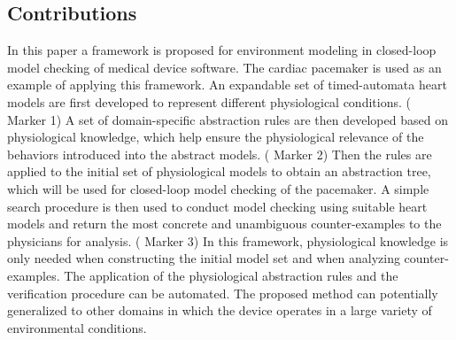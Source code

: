 \subsection{Contributions}
In this paper a framework is proposed for environment modeling in closed-loop model checking of medical device software.
The cardiac pacemaker is used as an example of applying this framework.
An expandable set of timed-automata heart models are first developed to represent different physiological conditions. ( Marker 1)
A set of domain-specific abstraction rules are then developed based on physiological knowledge, which help ensure the physiological relevance of the behaviors introduced into the abstract models. ( Marker 2)
Then the rules are applied to the initial set of physiological models to obtain an abstraction tree, which will be used for closed-loop model checking of the pacemaker. 
A simple search procedure is then used to conduct model checking using suitable heart models and return the most concrete and unambiguous counter-examples to the physicians for analysis. ( Marker 3)
In this framework, physiological knowledge is only needed when constructing the initial model set and when analyzing counter-examples. 
The application of the physiological abstraction rules and the verification procedure can be automated.
The proposed method can potentially generalized to other domains in which the device operates in a large variety of environmental conditions.

